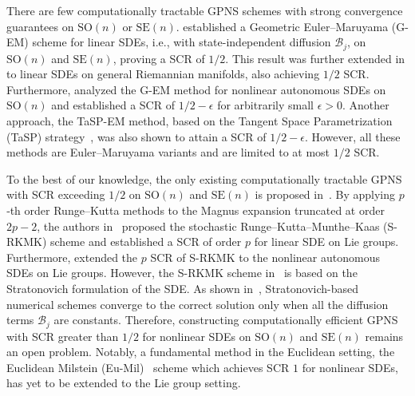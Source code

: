 \documentclass[11pt, a4paper, onecolumn]{article}
\newcommand{\SOn}{\mathrm{SO}(n)}
\newcommand{\SEn}{\mathrm{SE}(n)}
\newcommand{\B}{\mathcal{B}}
\begin{document}
There are few computationally tractable GPNS schemes with strong convergence guarantees on $\SOn$ or $\SEn$. \cite{piggott2016geometric} established a Geometric Euler–Maruyama (G-EM) scheme for linear SDEs, i.e., with state-independent diffusion $\B_j$, on $\SOn$ and $\SEn$, proving a SCR of $1/2$. This result was further extended in \cite{cheng2022theory} to linear SDEs on general Riemannian manifolds, also achieving $1/2$ SCR. Furthermore, \cite{solo2024stratonovich} analyzed the G-EM method for nonlinear autonomous SDEs on $\SOn$ and established a SCR of $1/2 - \epsilon$ for arbitrarily small $\epsilon > 0$. Another approach, the TaSP-EM method, based on the Tangent Space Parametrization (TaSP) strategy~\cite{wang2025tangent}, was also shown to attain a SCR of $1/2 - \epsilon$. However, all these methods are Euler–Maruyama variants and are limited to at most $1/2$ SCR.

To the best of our knowledge, the only existing computationally tractable GPNS with SCR exceeding $1/2$ on $\SOn$ and $\SEn$ is proposed in~\cite{muniz2022higher,muniz2023strong}. By applying $p$‑th order Runge–Kutta methods to the Magnus expansion truncated at order $2p - 2$, the authors in~\cite{muniz2022higher} proposed the stochastic Runge–Kutta–Munthe–Kaas (S-RKMK) scheme and established a SCR of order $p$ for linear SDE on Lie groups. Furthermore, \cite{muniz2023strong} extended the $p$ SCR of S-RKMK to the nonlinear autonomous SDEs on Lie groups. However, the S-RKMK scheme in~\cite{muniz2023strong} is based on the Stratonovich formulation of the SDE. As shown in~\cite{solo2024stratonovich}, Stratonovich-based numerical schemes converge to the correct solution only when all the diffusion terms $\B_j$ are constants. Therefore, constructing computationally efficient GPNS with SCR greater than $1/2$ for nonlinear SDEs on $\SOn$ and $\SEn$ remains an open problem. Notably, a fundamental method in the Euclidean setting, the Euclidean Milstein (Eu-Mil)~\cite{mil1975approximate} scheme which achieves SCR $1$ for nonlinear SDEs, has yet to be extended to the Lie group setting.
\end{document}
